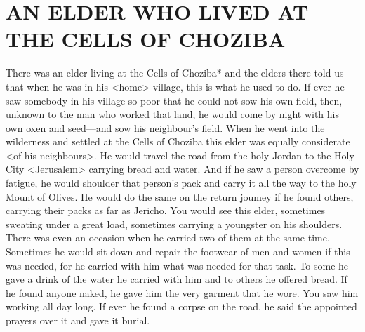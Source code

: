 \chapter{AN ELDER WHO LIVED AT THE CELLS OF CHOZIBA}

There was an elder living at the Cells of Choziba* and the elders there told us that when he was in his <home> village, this is what he used to do.
If ever he saw somebody in his village so poor that he could not sow his own field, then, unknown to the man who worked that land, he would come by night with his own oxen and seed—and sow his neighbour's field.
When he went into the wilderness and settled at the Cells of Choziba this elder was equally considerate <of his neighbours>. He would travel the road from the holy Jordan to the Holy City <Jerusalem> carrying bread and water.
And if he saw a person overcome by fatigue, he would shoulder that person's pack and carry it all the way to the holy Mount of Olives.
He would do the same on the return joumey if he found others, carrying their packs as far as Jericho.
You would see this elder, sometimes sweating under a great load, sometimes carrying a youngster on his shoulders.
There was even an occasion when he carried two of them at the same time.
Sometimes he would sit down and repair the footwear of men and women if this was needed, for he carried with him what was needed for that task.
To some he gave a drink of the water he carried with him and to others he offered bread.
If he found anyone naked, he gave him the very garment that he wore.
You saw him working all day long.
If ever he found a corpse on the road, he said the appointed prayers over it and gave it burial.
